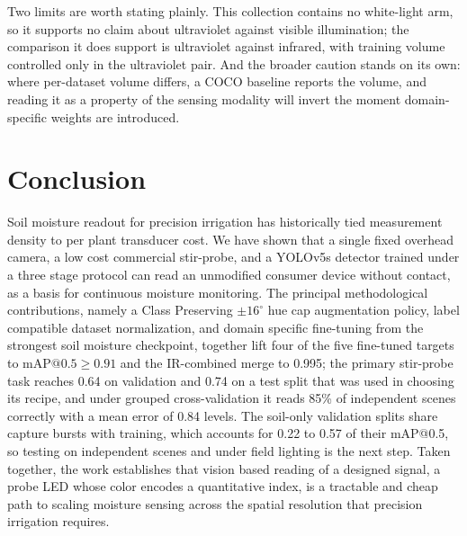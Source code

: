 ﻿\documentclass[journal]{IEEEtran}
\begin{document}
Two limits are worth stating plainly. This collection contains no white-light arm, so it supports no claim about ultraviolet against visible illumination; the comparison it does support is ultraviolet against infrared, with training volume controlled only in the ultraviolet pair. And the broader caution stands on its own: where per-dataset volume differs, a COCO baseline reports the volume, and reading it as a property of the sensing modality will invert the moment domain-specific weights are introduced.

\section{Conclusion}
\label{sec:conclusion}
Soil moisture readout for precision irrigation has historically tied measurement density to per plant transducer cost. We have shown that a single fixed overhead camera, a low cost commercial stir-probe, and a YOLOv5s detector trained under a three stage protocol can read an unmodified consumer device without contact, as a basis for continuous moisture monitoring. The principal methodological contributions, namely a Class Preserving $\pm 16^{\circ}$ hue cap augmentation policy, label compatible dataset normalization, and domain specific fine-tuning from the strongest soil moisture checkpoint, together lift four of the five fine-tuned targets to $\text{mAP@0.5} \geq 0.91$ and the IR-combined merge to 0.995; the primary stir-probe task reaches 0.64 on validation and 0.74 on a test split that was used in choosing its recipe, and under grouped cross-validation it reads 85\% of independent scenes correctly with a mean error of 0.84 levels. The soil-only validation splits share capture bursts with training, which accounts for 0.22 to 0.57 of their mAP@0.5, so testing on independent scenes and under field lighting is the next step. Taken together, the work establishes that vision based reading of a designed signal, a probe LED whose color encodes a quantitative index, is a tractable and cheap path to scaling moisture sensing across the spatial resolution that precision irrigation requires.



\end{document}
